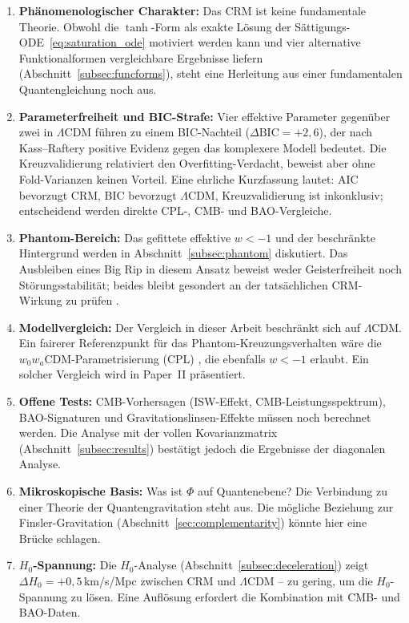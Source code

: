 \documentclass[aps,prd,twocolumn,superscriptaddress,nofootinbib]{revtex4-2}
\begin{document}
\begin{enumerate}
\item \textbf{Phänomenologischer Charakter:} Das CRM ist keine fundamentale Theorie. Obwohl die $\tanh$-Form als exakte Lösung der Sättigungs-ODE~\eqref{eq:saturation_ode} motiviert werden kann und vier alternative Funktionalformen vergleichbare Ergebnisse liefern (Abschnitt~\ref{subsec:funcforms}), steht eine Herleitung aus einer fundamentalen Quantengleichung noch aus.
\item \textbf{Parameterfreiheit und BIC-Strafe:} Vier effektive Parameter gegenüber zwei in $\Lambda$CDM führen zu einem BIC-Nachteil ($\Delta\mathrm{BIC} = +2{,}6$), der nach Kass--Raftery positive Evidenz gegen das komplexere Modell bedeutet. Die Kreuzvalidierung relativiert den Overfitting-Verdacht, beweist aber ohne Fold-Varianzen keinen Vorteil. Eine ehrliche Kurzfassung lautet: AIC bevorzugt CRM, BIC bevorzugt $\Lambda$CDM, Kreuzvalidierung ist inkonklusiv; entscheidend werden direkte CPL-, CMB- und BAO-Vergleiche.
\item \textbf{Phantom-Bereich:} Das gefittete effektive $w<-1$ und der beschränkte Hintergrund werden in Abschnitt~\ref{subsec:phantom} diskutiert. Das Ausbleiben eines Big Rip in diesem Ansatz beweist weder Geisterfreiheit noch Störungsstabilität; beides bleibt gesondert an der tatsächlichen CRM-Wirkung zu prüfen \cite{Sotiriou2010}.
\item \textbf{Modellvergleich:} Der Vergleich in dieser Arbeit beschränkt sich auf $\Lambda$CDM. Ein fairerer Referenzpunkt für das Phantom-Kreuzungsverhalten wäre die $w_0w_a$CDM-Parametrisierung (CPL) \cite{Chevallier2001, Linder2003}, die ebenfalls $w < -1$ erlaubt. Ein solcher Vergleich wird in Paper~II präsentiert.
\item \textbf{Offene Tests:} CMB-Vorhersagen (ISW-Effekt, CMB-Leistungsspektrum), BAO-Signaturen und Gravitationslinsen-Effekte müssen noch berechnet werden. Die Analyse mit der vollen Kovarianzmatrix (Abschnitt~\ref{subsec:results}) bestätigt jedoch die Ergebnisse der diagonalen Analyse.
\item \textbf{Mikroskopische Basis:} Was ist $\Phi$ auf Quantenebene? Die Verbindung zu einer Theorie der Quantengravitation steht aus. Die mögliche Beziehung zur Finsler-Gravitation (Abschnitt~\ref{sec:complementarity}) könnte hier eine Brücke schlagen.
\item \textbf{$H_0$-Spannung:} Die $H_0$-Analyse (Abschnitt~\ref{subsec:deceleration}) zeigt $\Delta H_0 = +0{,}5\,$km/s/Mpc zwischen CRM und $\Lambda$CDM -- zu gering, um die $H_0$-Spannung zu lösen. Eine Auflösung erfordert die Kombination mit CMB- und BAO-Daten.

\end{enumerate}
\end{document}
